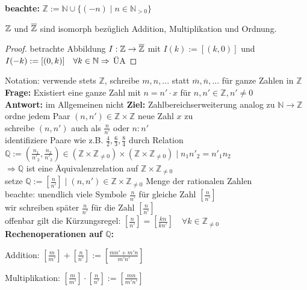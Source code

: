 \noindent \textbf{beachte:} $\mathbb Z := \mathbb N \cup \{(-n) \mid n \in \mathbb N_{>0}\}$ \\

\begin{satz}
	$\mathbb{Z}$ und $\overline{\mathbb{Z}}$ sind isomorph bezüglich Addition, Multiplikation und Ordnung.
\end{satz}

\begin{proof}
	betrachte Abbildung $I: \mathbb Z \to \overline{\mathbb{Z}} $ mit $I(k):=[(k,0)]$ und $I(-k):=[(0,k)] \quad \forall k \in \mathbb{N} \Rightarrow$ ÜA \QEDA
\end{proof}

\noindent Notation: verwende stets $\mathbb Z$, schreibe $m,n,...$ statt $\overline m, \overline n,...$ für
ganze Zahlen in $\mathbb Z$ \\

\noindent \textbf{Frage:} Existiert eine ganze Zahl mit $n=n' \cdot x$ f\"ur $n,n' \in \mathbb Z, n' \neq 0$ \\
\textbf{Antwort:} im Allgemeinen nicht
\textbf{Ziel:} Zahlbereichserweiterung analog zu $\mathbb N \to \mathbb Z$ \\
ordne jedem Paar $(n,n') \in \mathbb Z \times \mathbb Z$ neue Zahl $x$ zu \\
schreibe $(n,n')$ auch als $\frac{n}{n'}$ oder $n:n'$ \\
identifiziere Paare wie z.B. $\frac 4 2, \frac 6 3, \frac 8 4$ durch Relation \\
$\mathbb Q := {(\frac{n_1}{n'_2}, \frac{n_2}{n'_2}) \in (\mathbb Z \times \mathbb Z_{\neq 0}) 
	\times (\mathbb Z \times \mathbb Z_{\neq 0}) \mid n_1n'_2=n'_1n_2}$ \\
$\Rightarrow \mathbb Q$ ist eine Äquivalenzrelation auf $\mathbb Z \times \mathbb Z_{\neq 0}$ \\

\noindent setze $\mathbb Q := {[\frac{n}{n'}] \mid (n,n') \in \mathbb Z \times \mathbb Z_{\neq 0}}$ Menge der
rationalen Zahlen \\
beachte: unendlich viele Symbole $\frac{n}{n'}$ für gleiche Zahl $[\frac{n}{n'}]$ \\
wir schreiben später $\frac{n}{n'}$ für die Zahl $[\frac{n}{n'}]$ \\
\noindent offenbar gilt die Kürzungsregel: $[\frac{n}{n'}]=[\frac{kn}{kn'}] \quad \forall k \in 
\mathbb Z_{\neq 0}$ \\

\noindent \textbf{Rechenoperationen auf $\mathbb Q$:} \\
\begin{compactitem}
	\item Addition: $[\frac{m}{m'}]+[\frac{n}{n'}] := [\frac{mn'+m'n}{m'n'}]$
	\item Multiplikation: $[\frac{m}{m'}] \cdot [\frac{n}{n'}] := [\frac{mn}{m'n'}]$
\end{compactitem}

